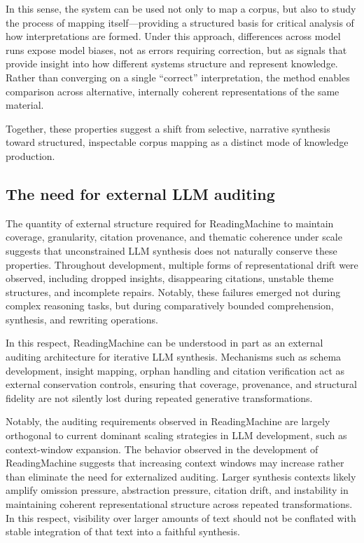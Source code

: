 \documentclass[
  11pt,
]{article}
\begin{document}
In this sense, the system can be used not only to map a corpus, but also
to study the process of mapping itself---providing a structured basis
for critical analysis of how interpretations are formed. Under this
approach, differences across model runs expose model biases, not as
errors requiring correction, but as signals that provide insight into
how different systems structure and represent knowledge. Rather than
converging on a single ``correct'' interpretation, the method enables
comparison across alternative, internally coherent representations of
the same material.

Together, these properties suggest a shift from selective, narrative
synthesis toward structured, inspectable corpus mapping as a distinct
mode of knowledge production.

\subsection{The need for external LLM auditing}\label{the-need-for-external-llm-auditing}

The quantity of external structure required for ReadingMachine to 
maintain coverage, granularity, citation provenance, and thematic 
coherence under scale suggests that unconstrained LLM synthesis 
does not naturally conserve these properties. Throughout development, 
multiple forms of representational drift were observed, including 
dropped insights, disappearing citations, unstable theme structures, 
and incomplete repairs. Notably, these failures emerged not during 
complex reasoning tasks, but during comparatively bounded comprehension, 
synthesis, and rewriting operations.

In this respect, ReadingMachine can be understood in part as an external 
auditing architecture for iterative LLM synthesis. Mechanisms such as 
schema development, insight mapping, orphan handling and citation 
verification act as external conservation controls, ensuring that coverage, 
provenance, and structural fidelity are not silently lost during repeated 
generative transformations.

Notably, the auditing requirements observed in ReadingMachine are largely 
orthogonal to current dominant scaling strategies in LLM development, 
such as context-window expansion. The behavior observed in the development 
of ReadingMachine suggests that increasing context windows may increase 
rather than eliminate the need for externalized auditing. Larger synthesis 
contexts likely amplify omission pressure, abstraction pressure, citation 
drift, and instability in maintaining coherent representational structure 
across repeated transformations. In this respect, visibility over larger 
amounts of text should not be conflated with stable integration of that 
text into a faithful synthesis.
\end{document}
